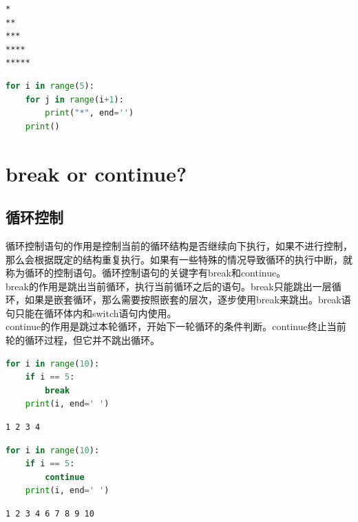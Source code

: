 \vspace{0.5cm}


\begin{lstlisting}
*
**
***
****
*****
\end{lstlisting}

\begin{lstlisting}[language=Python]
for i in range(5):
    for j in range(i+1):
        print("*", end='')
    print()
\end{lstlisting}

\newpage

\section{break or continue?}

\subsection{循环控制}

循环控制语句的作用是控制当前的循环结构是否继续向下执行，如果不进行控制，那么会根据既定的结构重复执行。如果有一些特殊的情况导致循环的执行中断，就称为循环的控制语句。循环控制语句的关键字有break和continue。\\

break的作用是跳出当前循环，执行当前循环之后的语句。break只能跳出一层循环，如果是嵌套循环，那么需要按照嵌套的层次，逐步使用break来跳出。break语句只能在循环体内和switch语句内使用。\\

continue的作用是跳过本轮循环，开始下一轮循环的条件判断。continue终止当前轮的循环过程，但它并不跳出循环。\\


\begin{lstlisting}[language=Python]
for i in range(10):
    if i == 5:
        break
    print(i, end=' ')
\end{lstlisting}

\begin{tcolorbox}
    \begin{verbatim}
1 2 3 4
\end{verbatim}
\end{tcolorbox}

\vspace{0.5cm}


\begin{lstlisting}[language=Python]
for i in range(10):
    if i == 5:
        continue
    print(i, end=' ')
\end{lstlisting}

\begin{tcolorbox}
    \begin{verbatim}
1 2 3 4 6 7 8 9 10
\end{verbatim}
\end{tcolorbox}

\newpage